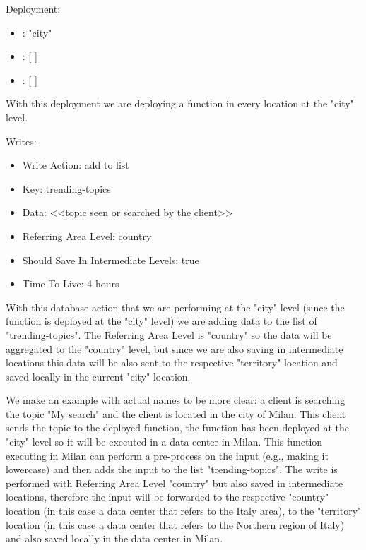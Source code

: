 \begin{example}
Deployment:
\begin{itemize}
    \item {}: "city"
    \item {}: [ ]
    \item {}: [ ]
\end{itemize}
With this deployment we are deploying a function in every location at the "city" level.

Writes:
\begin{itemize}
    \item Write Action: add to list
    \item Key: trending-topics
    \item Data: <<topic seen or searched by the client>>
    \item Referring Area Level: country
    \item Should Save In Intermediate Levels: true
    \item Time To Live: 4 hours
\end{itemize}
With this database action that we are performing at the "city" level (since the function is deployed at the "city" level) we are adding data to the list of "trending-topics". The Referring Area Level is "country" so the data will be aggregated to the "country" level, but since we are also saving in intermediate locations this data will be also sent to the respective "territory" location and saved locally in the current "city" location.

We make an example with actual names to be more clear: a client is searching the topic "My search" and the client is located in the city of Milan. This client sends the topic to the deployed function, the function has been deployed at the "city" level so it will be executed in a data center in Milan. This function executing in Milan can perform a pre-process on the input (e.g., making it lowercase) and then adds the input to the list "trending-topics". The write is performed with Referring Area Level "country" but also saved in intermediate locations, therefore the input will be forwarded to the respective "country" location (in this case a data center that refers to the Italy area), to the "territory" location (in this case a data center that refers to the Northern region of Italy) and also saved locally in the data center in Milan.
\end{example}

